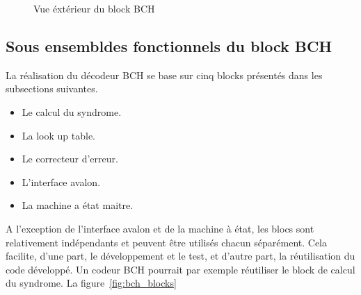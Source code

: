 \documentclass[a4paper, 11pt, svgnames]{report}
\begin{document}
            \begin{figure}[H]
                \centering
                \caption{Vue éxtérieur du block BCH}
                \label{fig:bch}
            \end{figure}

            \subsection{Sous ensembldes fonctionnels du block BCH}
            \label{sec:fonc_bch}
            La réalisation du décodeur BCH se base sur cinq blocks
            présentés dans les subsections suivantes.
            \begin{itemize}
                \item Le calcul du syndrome.
                \item La look up table.
                \item Le correcteur d'erreur.
                \item L'interface avalon.
                \item La machine a état maitre.
            \end{itemize}
            A l'exception de l'interface avalon et de la machine à état, les
            blocs sont relativement indépendants et peuvent être utilisés
            chacun séparément. Cela facilite, d'une part, le développement et
            le test, et d'autre part, la réutilisation du code développé. Un
            codeur BCH pourrait par exemple réutiliser le block de calcul du
            syndrome. La figure~\ref{fig:bch_blocks}
\end{document}
